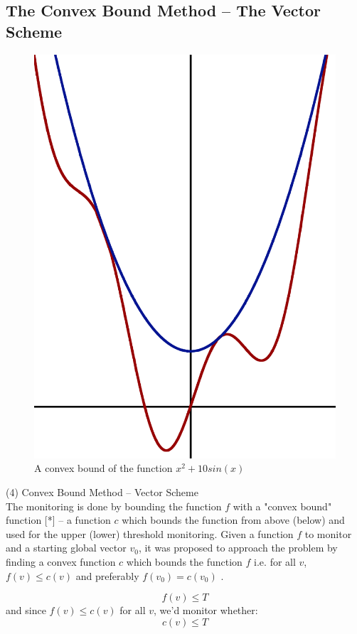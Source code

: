 \documentclass[10pt, conference]{IEEEtran}
\begin{document}
\subsection{The Convex Bound Method -- The Vector Scheme}
\begin{figure}[b]
\begin{center}
\includegraphics[width=0.3\linewidth]{Pics/PNGs/ConvexBound.png}
\end{center}
\caption{A convex bound of the function $x^2+10sin(x)$}
\end{figure}
(4) Convex Bound Method -- Vector Scheme \\
The monitoring is done by bounding the function $f$ with a "convex bound" function [*] -- a function $c$ which bounds the function from above (below) and used for the upper (lower) threshold monitoring.
Given a function $f$ to monitor and a starting global vector $v_0$, it was proposed to approach the problem by finding a convex function $c$ which bounds the function $f$ i.e. for all $v$, ${f(v) \leq c(v)}$ and preferably ${f(v_0)=c(v_0)}$ \cite{lazerson2018lightweight}. 


\begin{equation}
f(v) \leq T
\end{equation}
and since ${f(v) \leq c(v)}$ for all $v$, we'd monitor whether:
\begin{equation}
\label{monitoringConstraint}
c(v) \leq T
\end{equation}

\end{document}
